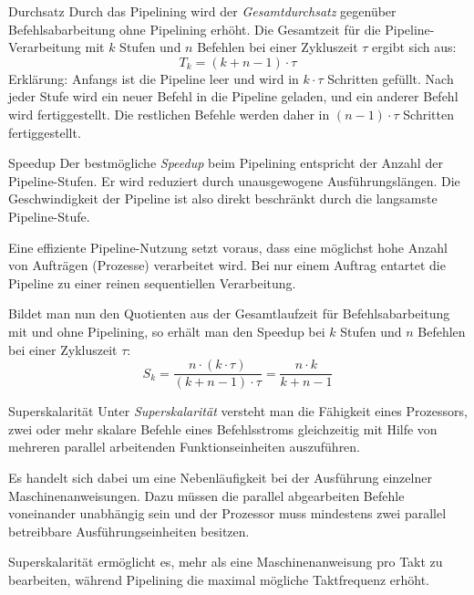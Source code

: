 \begin{defi}[Pipelining]{Durchsatz}
    Durch das Pipelining wird der \emph{Gesamtdurchsatz} gegenüber Befehlsabarbeitung ohne Pipelining erhöht.
    Die Gesamtzeit für die Pipeline-Verarbeitung mit $k$ Stufen und $n$ Befehlen bei einer Zykluszeit $\tau$ ergibt sich aus:
    \[
        T_k = (k + n - 1) \cdot \tau
    \]
    Erklärung: Anfangs ist die Pipeline leer und wird in $k \cdot \tau$ Schritten gefüllt.
    Nach jeder Stufe wird ein neuer Befehl in die Pipeline geladen, und ein anderer Befehl wird fertiggestellt.
    Die restlichen Befehle werden daher in $(n-1)\cdot \tau$ Schritten fertiggestellt.
\end{defi}

\begin{defi}[Pipelining]{Speedup}
    Der bestmögliche \emph{Speedup} beim Pipelining entspricht der Anzahl der Pipeline-Stufen.
    Er wird reduziert durch unausgewogene Ausführungslängen.
    Die Geschwindigkeit der Pipeline ist also direkt beschränkt durch die langsamste Pipeline-Stufe.
    
    Eine effiziente Pipeline-Nutzung setzt voraus, dass eine möglichst hohe Anzahl von Aufträgen (Prozesse) verarbeitet wird.
    Bei nur einem Auftrag entartet die Pipeline zu einer reinen sequentiellen Verarbeitung.
    
    Bildet man nun den Quotienten aus der Gesamtlaufzeit für Befehlsabarbeitung mit und ohne Pipelining, so erhält man den Speedup bei $k$ Stufen und $n$ Befehlen bei einer Zykluszeit $\tau$:
    \[
        S_k = \frac{n \cdot (k \cdot \tau)}{(k + n - 1) \cdot \tau} = \frac{n \cdot k}{k + n - 1}
    \]
\end{defi}

\begin{defi}{Superskalarität}
    Unter \emph{Superskalarität} versteht man die Fähigkeit eines Prozessors, zwei oder mehr skalare Befehle eines Befehlsstroms gleichzeitig mit Hilfe von mehreren parallel arbeitenden Funktionseinheiten auszuführen.
    
    Es handelt sich dabei um eine Nebenläufigkeit bei der Ausführung einzelner Maschinenanweisungen.
    Dazu müssen die parallel abgearbeiten Befehle voneinander unabhängig sein und der Prozessor muss mindestens zwei parallel betreibbare Ausführungseinheiten besitzen.
    
    Superskalarität ermöglicht es, mehr als eine Maschinenanweisung pro Takt zu bearbeiten, während Pipelining die maximal mögliche Taktfrequenz erhöht.
\end{defi}

